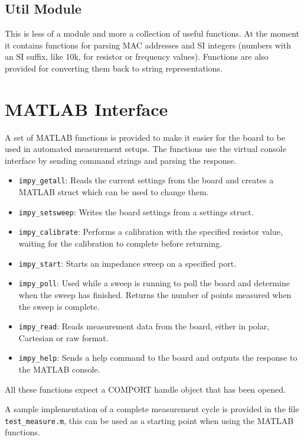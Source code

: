 

\subsection{Util Module}

This is less of a module and more a collection of useful functions. At the moment it contains functions for parsing
MAC addresses and SI integers (numbers with an SI suffix, like 10k, for resistor or frequency values). Functions
are also provided for converting them back to string representations.


\clearpage
\section{MATLAB Interface} \label{sec:matlab}

A set of MATLAB functions is provided to make it easier for the board to be used in automated measurement setups.
The functions use the virtual console interface by sending command strings and parsing the response.
%
\begin{itemize}
	\item \verb!impy_getall!: Reads the current settings from the board and creates a MATLAB struct which can be used to
    change them.
  \item \verb!impy_setsweep!: Writes the board settings from a settings struct.
  \item \verb!impy_calibrate!: Performs a calibration with the specified resistor value, waiting for the calibration to
    complete before returning.
  \item \verb!impy_start!: Starts an impedance sweep on a specified port.
  \item \verb!impy_poll!: Used while a sweep is running to poll the board and determine when the sweep has finished.
    Returns the number of points measured when the sweep is complete.
  \item \verb!impy_read!: Reads measurement data from the board, either in polar, Cartesian or raw format.
  \item \verb!impy_help!: Sends a help command to the board and outputs the response to the MATLAB console.
\end{itemize}

All these functions expect a COMPORT handle object that has been opened.

A sample implementation of a complete measurement cycle is provided in the file \verb!test_measure.m!, this can be used
as a starting point when using the MATLAB functions.

